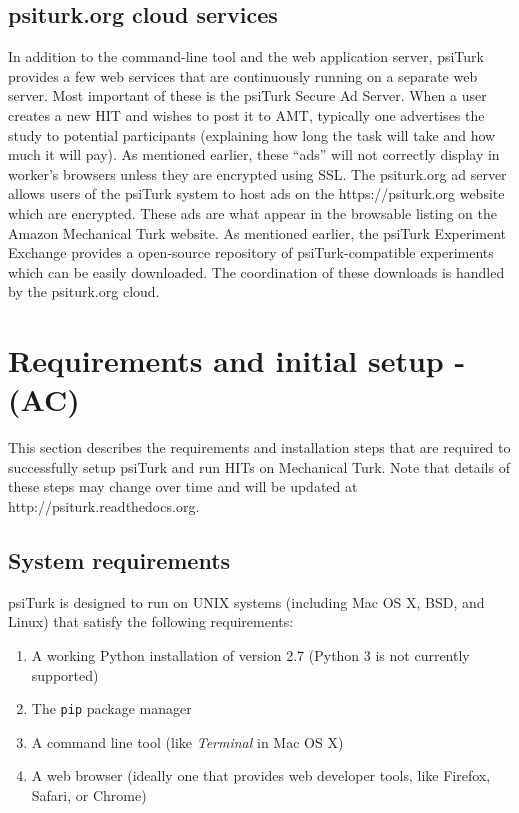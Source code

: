 \documentclass[twocolumn]{svjour3}          %
\newcommand{\psiturk}[0]{\textsf{psiTurk}}
\begin{document}
\subsection{\textsf{psiturk.org} cloud services}
In addition to the command-line tool and the web application server, \psiturk{}
provides a few web services that are continuously running on a separate web server.
Most important of these is the \psiturk{} Secure Ad Server.  When a user
creates a new HIT and wishes to post it to AMT, typically one advertises the
study to potential participants (explaining how long the task will take and how
much it will pay).  As mentioned earlier, these ``ads'' will not correctly display
in worker's browsers unless they are encrypted using SSL.  The \textsf{psiturk.org}
ad server allows users of the \psiturk{} system to host ads on the \textsf{https://psiturk.org}
website which are encrypted.  These ads are what appear in the browsable listing
on the Amazon Mechanical Turk website.
As mentioned earlier, the \psiturk{} Experiment Exchange provides
a open-source repository of \psiturk{}-compatible experiments which can be 
easily downloaded.  The coordination of these downloads is handled by the \textsf{psiturk.org} cloud.


\section{Requirements and initial setup - (AC)}
This section describes the requirements and installation steps that are required to successfully setup \psiturk{} and run
HITs on Mechanical Turk. Note that details of these steps may change over time and will be updated at \textsf{http://psiturk.readthedocs.org}.

\subsection{System requirements}
\psiturk{} is designed to run on UNIX systems (including Mac OS X, BSD, and Linux) that satisfy the following requirements:

\begin{enumerate}
\item A working Python installation of version 2.7 (Python 3 is not currently supported)
\item The \texttt{pip} package manager 
\item A command line tool (like \emph{Terminal} in Mac OS X)
\item A web browser (ideally one that provides web developer tools, like Firefox, Safari, or Chrome)
\end{enumerate}
\end{document}
